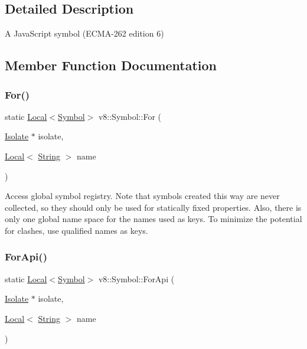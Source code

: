 \subsection{Detailed Description}
A Java\+Script symbol (E\+C\+M\+A-\/262 edition 6) 

\subsection{Member Function Documentation}
\mbox{\label{classv8_1_1Symbol_a8a4a6bdc7d3e31c71cf48fa5cb811fc8}} 
\subsubsection{\texorpdfstring{For()}{For()}}
{\footnotesize\ttfamily static \mbox{\hyperlink{classv8_1_1Local}{Local}}$<$\mbox{\hyperlink{classv8_1_1Symbol}{Symbol}}$>$ v8\+::\+Symbol\+::\+For (\begin{DoxyParamCaption}\item[{\mbox{\hyperlink{classv8_1_1Isolate}{Isolate}} $\ast$}]{isolate,  }\item[{\mbox{\hyperlink{classv8_1_1Local}{Local}}$<$ \mbox{\hyperlink{classv8_1_1String}{String}} $>$}]{name }\end{DoxyParamCaption})\hspace{0.3cm}{\ttfamily [static]}}

Access global symbol registry. Note that symbols created this way are never collected, so they should only be used for statically fixed properties. Also, there is only one global name space for the names used as keys. To minimize the potential for clashes, use qualified names as keys. \mbox{\label{classv8_1_1Symbol_ac3937f0b0b831c4be495a399f26d7301}} 
\subsubsection{\texorpdfstring{For\+Api()}{ForApi()}}
{\footnotesize\ttfamily static \mbox{\hyperlink{classv8_1_1Local}{Local}}$<$\mbox{\hyperlink{classv8_1_1Symbol}{Symbol}}$>$ v8\+::\+Symbol\+::\+For\+Api (\begin{DoxyParamCaption}\item[{\mbox{\hyperlink{classv8_1_1Isolate}{Isolate}} $\ast$}]{isolate,  }\item[{\mbox{\hyperlink{classv8_1_1Local}{Local}}$<$ \mbox{\hyperlink{classv8_1_1String}{String}} $>$}]{name }\end{DoxyParamCaption})\hspace{0.3cm}{\ttfamily [static]}}

